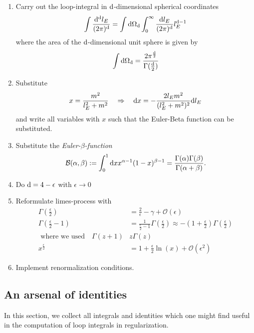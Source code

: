 \begin{enumerate}
	\item  Carry out the loop-integral in $\mathrm{d}$-dimensional spherical coordinates
	\begin{equation}
		\int \frac{\mathrm{d}^{\mathrm{d}}l_E}{(2\pi)^{\mathrm{d}}} = \int \mathrm{d} \Omega_{\mathrm{d}} \int_0^\infty \frac{\mathrm{d} l_E}{(2 \pi)^{\mathrm{d}}} l^{\mathrm{d}-1}_E
	\end{equation}
	where the area of the $\mathrm{d}$-dimensional unit sphere is given by
	\begin{equation}
		\int \mathrm{d} \Omega_{\mathrm{d}} = \frac{2 \pi^{\frac{\mathrm{d}}{2}}}{\Gamma(\frac{\mathrm{d}}{2})}
	\end{equation}
	\item Substitute 
	\begin{equation*}
		x= \frac{m^2}{l^2_E+m^2} \quad \Rightarrow \quad \mathrm{d} x = - \frac{2 l_E m^2}{(l^2_E+m^2)^2} \mathrm{d} l_E
	\end{equation*}
and write all variables with $x$ such that the Euler-Beta function can be substituted.
	\item Substitute the \emph{Euler-$\beta$-function}
	\begin{equation}
		\mathcal{B}(\alpha, \beta) := \int_0^1 \mathrm{d} x x^{\alpha-1} (1-x)^{\beta-1}  = \frac{\Gamma(\alpha) \Gamma(\beta)}{\Gamma(\alpha+\beta)}.
	\end{equation}
	\item Do $\mathrm{d}=4-\epsilon$ with $\epsilon\rightarrow 0$
	\item Reformulate limes-process with
	\begin{align}
		\Gamma(\frac{\epsilon}{2}) &= \frac{2}{\epsilon} - \gamma + \mathcal{O}(\epsilon) \\
		\Gamma(\frac{\epsilon}{2} -1) &= \frac{1}{\frac{\epsilon}{2}-1} \Gamma(\frac{\epsilon}{2}) \approx - (1+\frac{\epsilon}{2}) \Gamma(\frac{\epsilon}{2}) \\
		\text{ where we used} \quad \Gamma(z+1) &z \Gamma(z) \nonumber\\
		x^{\frac{\epsilon}{2}} &= 1 + \frac{\epsilon}{2} \ln(x)+ \mathcal{O}(\epsilon^2)
	\end{align}
\item Implement renormalization conditions.
\end{enumerate}

\subsection{An arsenal of identities}
In this section, we collect all integrals and identities which one might find useful in the computation of loop integrals in regularization.
